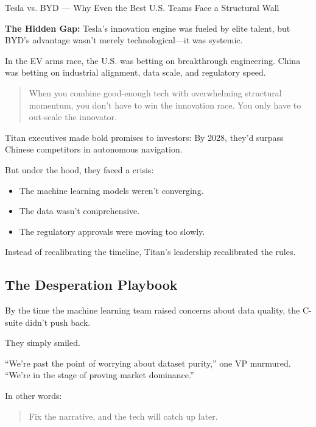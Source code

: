 \begin{HistoricalSidebar}{Tesla vs. BYD --- Why Even the Best U.S. Teams Face a Structural Wall}
    \medskip
    
    \textbf{The Hidden Gap:} Tesla’s innovation engine was fueled by elite talent, but BYD’s advantage wasn’t merely technological—it was systemic.
    
    \medskip
    
    In the EV arms race, the U.S. was betting on breakthrough engineering.  China was betting on industrial alignment, data scale, and regulatory speed.
    
    \begin{quote}
    When you combine good-enough tech with overwhelming structural momentum, you don’t have to win the innovation race.  You only have to out-scale the innovator.
    \end{quote}
    
\end{HistoricalSidebar}

\medskip    

Titan executives made bold promises to investors: By 2028, they’d surpass Chinese competitors in autonomous navigation.

But under the hood, they faced a crisis:

\begin{itemize}
\item The machine learning models weren’t converging.
\item The data wasn’t comprehensive.
\item The regulatory approvals were moving too slowly.
\end{itemize}

Instead of recalibrating the timeline, Titan’s leadership recalibrated the rules.

\subsection{The Desperation Playbook}

By the time the machine learning team raised concerns about data quality,
the C-suite didn’t push back.

They simply smiled.

“We’re past the point of worrying about dataset purity,” one VP murmured.
“We’re in the stage of proving market dominance.”

In other words:

\begin{quote}
    Fix the narrative, and the tech will catch up later.
\end{quote}

